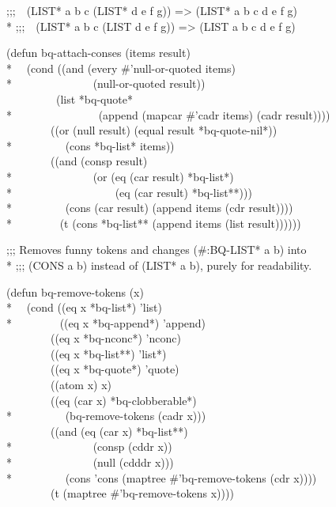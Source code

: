\begin{new}
\begin{lisp}
;;;~~(LIST* a b c (LIST* d e f g)) => (LIST* a b c d e f g) \\*
;;;~~(LIST* a b c (LIST d e f g)) => (LIST a b c d e f g)
\end{lisp}
\begin{lisp}
(defun bq-attach-conses (items result) \\*
~~(cond ((and (every \#'null-or-quoted items) \\*
~~~~~~~~~~~~~~(null-or-quoted result)) \\
~~~~~~~~~(list *bq-quote* \\*
~~~~~~~~~~~~~~~(append (mapcar \#'cadr items) (cadr result)))) \\
~~~~~~~~((or (null result) (equal result *bq-quote-nil*)) \\*
~~~~~~~~~(cons *bq-list* items)) \\
~~~~~~~~((and (consp result) \\*
~~~~~~~~~~~~~~(or (eq (car result) *bq-list*) \\*
~~~~~~~~~~~~~~~~~~(eq (car result) *bq-list**))) \\*
~~~~~~~~~(cons (car result) (append items (cdr result)))) \\*
~~~~~~~~(t (cons *bq-list** (append items (list result))))))
\end{lisp}
\begin{lisp}
;;; Removes funny tokens and changes (\#:BQ-LIST* a b) into \\*
;;; (CONS a b) instead of (LIST* a b), purely for readability.
\end{lisp}
\begin{lisp}
(defun bq-remove-tokens (x) \\*
~~(cond ((eq x *bq-list*) 'list) \\*
~~~~~~~~((eq x *bq-append*) 'append) \\
~~~~~~~~((eq x *bq-nconc*) 'nconc) \\
~~~~~~~~((eq x *bq-list**) 'list*) \\
~~~~~~~~((eq x *bq-quote*) 'quote) \\
~~~~~~~~((atom x) x) \\
~~~~~~~~((eq (car x) *bq-clobberable*) \\*
~~~~~~~~~(bq-remove-tokens (cadr x))) \\
~~~~~~~~((and (eq (car x) *bq-list**) \\*
~~~~~~~~~~~~~~(consp (cddr x)) \\*
~~~~~~~~~~~~~~(null (cdddr x))) \\*
~~~~~~~~~(cons 'cons (maptree \#'bq-remove-tokens (cdr x)))) \\
~~~~~~~~(t (maptree \#'bq-remove-tokens x))))
\end{lisp}


\end{new}

